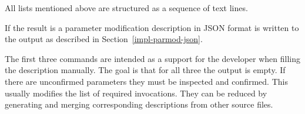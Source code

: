 All lists mentioned above are structured as a sequence of text lines.

If the result is a parameter modification description in JSON format is written to the output as described in 
Section~\ref{impl-parmod-json}.

The first three commands are intended as a support for the developer when filling the description manually. The goal is that
for all three the output is empty. If there are unconfirmed parameters they must be inspected and confirmed. This usually 
modifies the list of required invocations. They can be reduced by generating and merging corresponding descriptions
from other source files.

